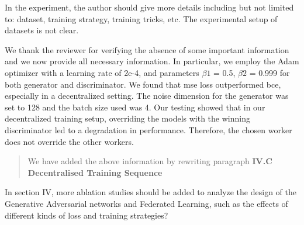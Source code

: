 \documentclass{article}
\begin{document}
\RC In the experiment, the author should give more details including but not limited to: dataset, training strategy, training tricks, etc. The experimental setup of datasets is not clear.

\AR We thank the reviewer for verifying the absence of some important information and we now provide all necessary information.
In particular, we employ the Adam optimizer with a learning rate of 2e-4, and parameters $\beta1$ = 0.5, $\beta2$ = 0.999 for both generator and discriminator.
We found that \gls*{mse} loss outperformed \gls*{bce}, especially in a decentralized setting. The noise dimension for the generator was set to 128 and the batch size used was 4. 
Our testing showed that in our decentralized training setup, overriding the models with the winning discriminator led to a degradation in performance. Therefore, the chosen worker does not override the other workers.


\begin{quote}
We have added the above information by rewriting paragraph \textbf{IV.C Decentralised Training Sequence}
\end{quote}

\RC In section IV, more ablation studies should be added to analyze the design of the Generative Adversarial networks and Federated Learning, such as the effects of different kinds of loss and training strategies?
\end{document}
